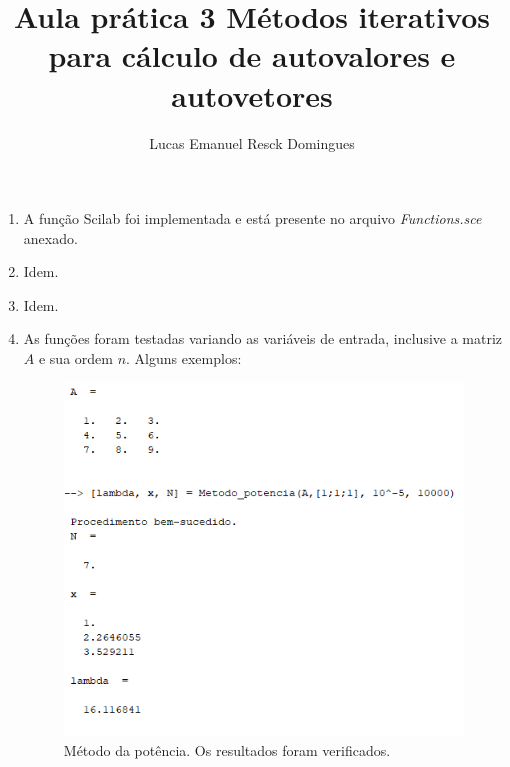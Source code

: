\documentclass[11pt]{article}
\begin{document}
\author{Lucas Emanuel Resck Domingues}
\title{Aula prática 3
\medbreak
\large Métodos iterativos para cálculo de autovalores e autovetores}
\maketitle

\medskip

\begin{enumerate}

\item A função Scilab foi implementada e está presente no arquivo \textit{Functions.sce} anexado.

\item Idem.

\item Idem.

\item As funções foram testadas variando as variáveis de entrada, inclusive a matriz $A$ e sua ordem $n$. Alguns exemplos:

\begin{figure}[H]
    \centering
    \includegraphics[]{4-1}
    \caption{Método da potência. Os resultados foram verificados.}
\end{figure}


\end{enumerate}
\end{document}
